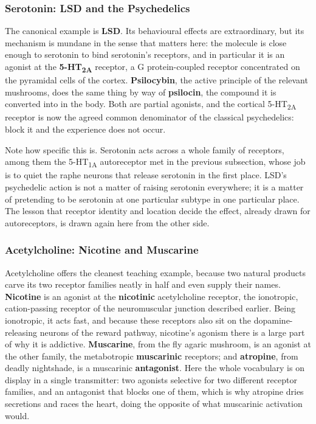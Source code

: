 \documentclass[11pt]{article}
\begin{document}
\subsubsection{Serotonin: LSD and the Psychedelics}

The canonical example is \textbf{LSD}. Its behavioural effects are extraordinary, but its mechanism is mundane in the sense that matters here: the molecule is close enough to serotonin to bind serotonin's receptors, and in particular it is an agonist at the \textbf{5-HT\textsubscript{2A}} receptor, a G protein-coupled receptor concentrated on the pyramidal cells of the cortex. \textbf{Psilocybin}, the active principle of the relevant mushrooms, does the same thing by way of \textbf{psilocin}, the compound it is converted into in the body. Both are partial agonists, and the cortical 5-HT\textsubscript{2A} receptor is now the agreed common denominator of the classical psychedelics: block it and the experience does not occur.

Note how specific this is. Serotonin acts across a whole family of receptors, among them the 5-HT\textsubscript{1A} autoreceptor met in the previous subsection, whose job is to quiet the raphe neurons that release serotonin in the first place. LSD's psychedelic action is not a matter of raising serotonin everywhere; it is a matter of pretending to be serotonin at one particular subtype in one particular place. The lesson that receptor identity and location decide the effect, already drawn for autoreceptors, is drawn again here from the other side.

\subsubsection{Acetylcholine: Nicotine and Muscarine}

Acetylcholine offers the cleanest teaching example, because two natural products carve its two receptor families neatly in half and even supply their names. \textbf{Nicotine} is an agonist at the \textbf{nicotinic} acetylcholine receptor, the ionotropic, cation-passing receptor of the neuromuscular junction described earlier. Being ionotropic, it acts fast, and because these receptors also sit on the dopamine-releasing neurons of the reward pathway, nicotine's agonism there is a large part of why it is addictive. \textbf{Muscarine}, from the fly agaric mushroom, is an agonist at the other family, the metabotropic \textbf{muscarinic} receptors; and \textbf{atropine}, from deadly nightshade, is a muscarinic \textbf{antagonist}. Here the whole vocabulary is on display in a single transmitter: two agonists selective for two different receptor families, and an antagonist that blocks one of them, which is why atropine dries secretions and races the heart, doing the opposite of what muscarinic activation would.
\end{document}
